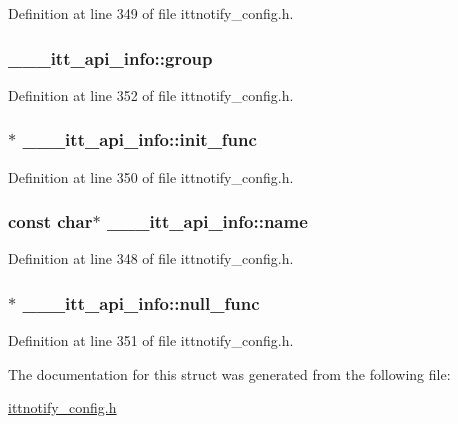 Definition at line 349 of file ittnotify\-\_\-config.\-h.

\hypertarget{struct______itt__api__info_a42bda2bfa667003e920bbf6995f5d375}{
\subsubsection[{group}]{ \-\_\-\-\_\-\-\_\-itt\-\_\-api\-\_\-info\-::group}}\label{struct______itt__api__info_a42bda2bfa667003e920bbf6995f5d375}


Definition at line 352 of file ittnotify\-\_\-config.\-h.

\hypertarget{struct______itt__api__info_a21210573f2cde6f6b8c781da860dad7b}{
\subsubsection[{init\-\_\-func}]{$\ast$ \-\_\-\-\_\-\-\_\-itt\-\_\-api\-\_\-info\-::init\-\_\-func}}\label{struct______itt__api__info_a21210573f2cde6f6b8c781da860dad7b}


Definition at line 350 of file ittnotify\-\_\-config.\-h.

\hypertarget{struct______itt__api__info_abb7f1e06b74fb586eb8d1e7570cd6263}{
\subsubsection[{name}]{\setlength{\rightskip}{0pt plus 5cm}const char$\ast$ \-\_\-\-\_\-\-\_\-itt\-\_\-api\-\_\-info\-::name}}\label{struct______itt__api__info_abb7f1e06b74fb586eb8d1e7570cd6263}


Definition at line 348 of file ittnotify\-\_\-config.\-h.

\hypertarget{struct______itt__api__info_ab182f072fe2a2f4740be6b1d0499348f}{
\subsubsection[{null\-\_\-func}]{$\ast$ \-\_\-\-\_\-\-\_\-itt\-\_\-api\-\_\-info\-::null\-\_\-func}}\label{struct______itt__api__info_ab182f072fe2a2f4740be6b1d0499348f}


Definition at line 351 of file ittnotify\-\_\-config.\-h.



The documentation for this struct was generated from the following file\-:\begin{DoxyCompactItemize}
\item 
\hyperlink{ittnotify__config_8h}{ittnotify\-\_\-config.\-h}\end{DoxyCompactItemize}
